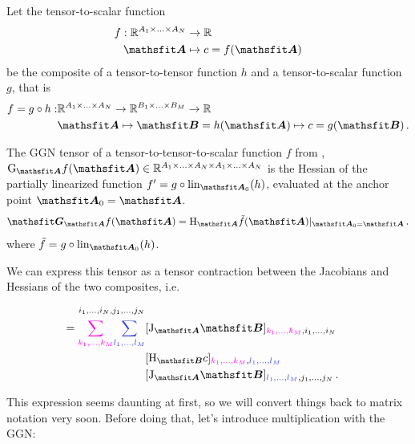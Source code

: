 \begin{setup}\label{setup:composite_tensor_to_tensor_to_scalar_function}
  Let the tensor-to-scalar function
  \begin{align*}
    f: \sR^{A_1 \times \ldots \times A_N} &\to \sR
    \\
    \tA &\mapsto c = f(\tA)
  \end{align*}
  be the composite of a tensor-to-tensor function $h$ and a tensor-to-scalar function $g$, that is
  \begin{align*}
    f = g \circ h: &\sR^{A_1 \times \ldots \times A_N} \to \sR^{B_1 \times \ldots \times B_M}  \to \sR
    \\
                   &\tA \mapsto \tB = h(\tA) \mapsto c = g(\tB)\,.
  \end{align*}
\end{setup}

\begin{definition}\label{def:general_ggn}%
  The GGN tensor of a tensor-to-tensor-to-scalar function $f$ from , $\ggn_{\tA} f(\tA) \in \sR^{A_1 \times \ldots \times A_N \times A_1 \times \ldots \times A_N}$ is the Hessian of the partially linearized function $f' = g \circ \lin_{\tA_0}(h)$, evaluated at the anchor point $\tA_0 = \tA$.
  \begin{align*}
    \tG_{\tA} f(\tA)
    =
    \hess_{\tA} \tilde{f}(\tA)|_{\tA_0 = \tA}\,.
  \end{align*}
  where $\tilde{f} = g \circ \lin_{\tA_0}(h)$.

  We can express this tensor as a tensor contraction between the Jacobians and Hessians of the two composites, i.e.\,
  \begin{align*}
    [\tG_{\tA} f(\tA)]_{i_1, \ldots, i_N, j_1, \ldots, j_N}
    \\
    =
    \textcolor{VectorPink}{\sum_{k_1, \dots, k_M}}
    \textcolor{VectorBlue}{\sum_{l_1, \dots, l_M}}
    & [\jac_{\tA} \tB]_{\textcolor{VectorPink}{k_1, \dots, k_M}, i_1, \dots, i_N}
    \\
    &[\hess_{\tB} c]_{\textcolor{VectorPink}{k_{1}, \ldots, k_{M}}, \textcolor{VectorBlue}{l_{1}, \ldots, l_{M}}}
    \\
    &[\jac_{\tA} \tB]_{\textcolor{VectorBlue}{l_1, \ldots, l_M}, j_1, \ldots, j_N}\,.
  \end{align*}
\end{definition}
This expression seems daunting at first, so we will convert things back to matrix notation very soon. Before doing that, let's introduce multiplication with the GGN:

